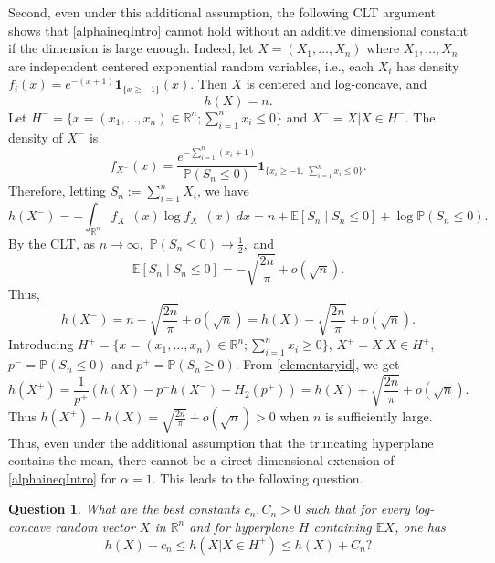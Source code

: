 \documentclass{article}
\theoremstyle{plain}
\newtheorem{question}[theorem]{Question}
\theoremstyle{definition}
\newcommand{\1}{\mathbf 1}
\begin{document}
Second, even under this additional assumption, the following CLT argument shows that \eqref{alphaineqIntro} cannot hold without an additive dimensional constant if the dimension is large enough. Indeed, let $X=(X_1,\ldots,X_n)$ where $X_1,\ldots ,X_n$   are independent centered exponential random variables, i.e., each $X_i$ has density
$
f_i(x)=e^{-(x+1)}\mathbf 1_{\{x\ge -1\}}(x).
$
Then \(X\) is centered and log-concave, and
\[
h(X)=n.
\]
Let $H^-=\{x=(x_1,\dots,x_n)\in\mathbb{R}^n; \sum_{i=1}^nx_i\le0\}$ and $X^-=X|X\in H^-.$
The density of \(X^-\)  is
\[
f_{X^-}(x)
=
\frac{e^{-\sum_{i=1}^n(x_i+1)}}
{\mathbb P(S_n\le 0)}
\mathbf 1_{\{x_i\ge -1,\ \sum_{i=1}^n{x_i}\le 0\}}.
\]
Therefore, letting $S_n:=\sum_{i=1}^n X_i$, we have
\[
h(X^-)
= -\int_{\mathbb R^n}f_{X^-}(x)\log{f_{X^-}(x)} \ dx =  
n+\mathbb E[S_n\mid S_n\le 0]
+
\log\mathbb P(S_n\le 0).
\]
By the CLT, as $n \to \infty,$
$
\mathbb P(S_n\le 0)\to \frac12,
$ 
and  
\[
\mathbb E[S_n\mid S_n\le0]
=-\sqrt{\frac{2n}{\pi}}+o(\sqrt n).
\]
Thus, 
\[
h(X^-)
=
n-\sqrt{\frac{2n}{\pi}}+o(\sqrt n)=h(X)-\sqrt{\frac{2n}{\pi}}+o(\sqrt n).
\]
Introducing $H^+=\{ x=(x_1,\dots,x_n)\in\mathbb{R}^n;\sum_{i=1}^nx_i\ge0\}$, $X^+=X|X\in H^+$, $p^{-}=\mathbb P(S_n\le 0)$ and $p^{+}=\mathbb P(S_n\ge 0)$. From \eqref{elementaryid}, we get
\[
h(X^+)=\frac{1}{p^+}\left(h(X)-p^{-}h(X^-)-H_2(p^+)\right)=h(X)+\sqrt{\frac{2n}{\pi}}+o(\sqrt n).
\]
Thus $h(X^+)-h(X)=\sqrt{\frac{2n}{\pi}}+o(\sqrt n)>0$ when $n$ is sufficiently large. Thus, even under the additional assumption that the truncating hyperplane contains the mean, there cannot be a direct dimensional extension of \eqref{alphaineqIntro} for $\alpha =1$.
This leads to the following question.
\begin{question}
    What are the best constants $c_n, C_n>0$ such that for every log-concave random vector $X$ in $\mathbb R^n$ and for hyperplane $H$ containing $\mathbb E X$, one has
    $$
    h(X)-c_n\le h(X|X\in H^+) \leq h(X) + C_n ?
    $$
\end{question}
\end{document}
